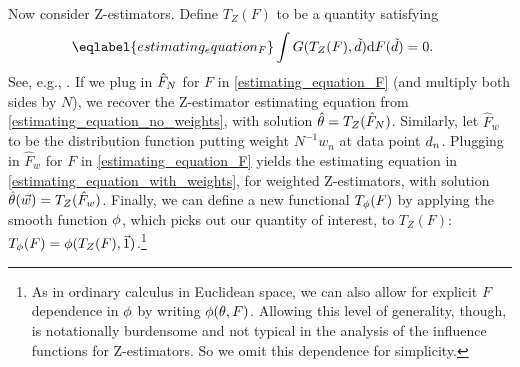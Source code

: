Now consider Z-estimators. Define $T_Z(F)$ to be a quantity satisfying
\begin{align} \eqlabel{estimating_equation_F}
	\int G(T_Z(F), \tilde{\d}) \dee F(\tilde{\d}) &= 0.
\end{align}
See, e.g., \citet[Section 4.2c, Def. 5]{hampel1986robustbook}. If we plug in
$\hat{F}_N$ for $F$ in \eqref{estimating_equation_F} (and multiply both sides by $N$),
we recover the Z-estimator estimating equation from
\eqref{estimating_equation_no_weights}, with solution $\hat{\theta} = T_Z(\hat{F}_N)$.
%
Similarly, let $\hat{F}_w$ to be the distribution function putting weight
$N^{-1} w_n$ at data point $d_{n}$. Plugging in $\hat{F}_w$ for $F$ in
\eqref{estimating_equation_F} yields the estimating equation in
\eqref{estimating_equation_with_weights}, for weighted Z-estimators, with
solution $\hat{\theta}(\vec{w}) = T_Z(\hat{F}_w)$.
%
Finally, we can define a new functional $T_\phi(F)$ by applying the smooth
function $\phi$, which picks out our quantity of interest, to $T_Z(F)$:
$T_\phi(F) = \phi(T_Z(F), \vec{1})$.\footnote{ As in ordinary calculus
in Euclidean space, we can also allow for explicit $F$ dependence in $\phi$
by writing $\phi(\theta, F)$. Allowing this level of generality, though, is
notationally burdensome and not typical in the analysis of the influence
functions for Z-estimators. So we omit this dependence for simplicity.}



